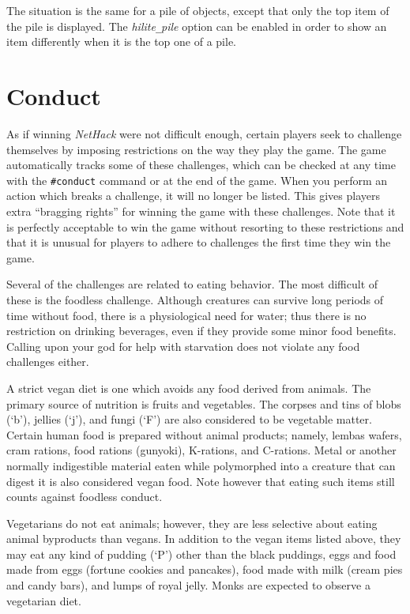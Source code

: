 The situation is the same for a pile of objects, except that only the
top item of the pile is displayed.
The
{\it hilite\verb+_+pile\/}
option can be enabled in order to show an item differently when it is
the top one of a pile.

\section{Conduct}

As if winning {\it NetHack\/} were not difficult enough, certain players
seek to challenge themselves by imposing restrictions on the
way they play the game.  The game automatically tracks some of
these challenges, which can be checked at any time with the {\tt \#conduct}
command or at the end of the game.  When you perform an action which
breaks a challenge, it will no longer be listed.  This gives
players extra ``bragging rights'' for winning the game with these
challenges.  Note that it is perfectly acceptable to win the game
without resorting to these restrictions and that it is unusual for
players to adhere to challenges the first time they win the game.

Several of the challenges are related to eating behavior.  The most
difficult of these is the foodless challenge.  Although creatures
can survive long periods of time without food, there is a physiological
need for water; thus there is no restriction on drinking beverages,
even if they provide some minor food benefits.
Calling upon your god for help with starvation does
not violate any food challenges either.

A strict vegan diet is one which avoids any food derived from animals.
The primary source of nutrition is fruits and vegetables.  The
corpses and tins of blobs (`b'), jellies (`j'), and fungi (`F') are
also considered to be vegetable matter.  Certain human
food is prepared without animal products; namely, lembas wafers, cram
rations, food rations (gunyoki), K-rations, and C-rations.
Metal or another normally indigestible material eaten while polymorphed
into a creature that can digest it is also considered vegan food.
Note however that eating such items still counts against foodless conduct.

Vegetarians do not eat animals;
however, they are less selective about eating animal byproducts than vegans.
In addition to the vegan items listed above, they may eat any kind
of pudding (`P') other than the black puddings,
eggs and food made from eggs (fortune cookies and pancakes),
food made with milk (cream pies and candy bars), and lumps of
royal jelly.  Monks are expected to observe a vegetarian diet.

